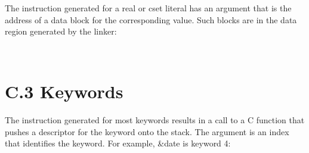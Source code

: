 \begin{flushleft}
\tablelasttail{\hline}
\begin{xtabular}{|m{1.9066598in}|m{2.75596in}|}

\end{xtabular}
\end{flushleft}

The instruction generated for a real or cset literal has an argument
that is the address of a data block for the corresponding value. Such
blocks are in the data region generated by the linker:

\begin{flushleft}
\tablelasttail{\hline}
\begin{xtabular}{|m{1.9066598in}|m{2.75596in}|}

\end{xtabular}
\end{flushleft}

\bigskip

\begin{flushleft}
\tablelasttail{\hline}
\begin{xtabular}{|m{1.9066598in}|m{2.75596in}|}

\end{xtabular}
\end{flushleft}
\section{C.3 Keywords}

The instruction generated for most keywords results in a call to a C
function that pushes a descriptor for the keyword onto the stack. The
argument is an index that identifies the keyword. For example, \&date
is keyword 4:

\begin{flushleft}
\tablelasttail{\hline}
\begin{xtabular}{|m{1.9066598in}|m{2.75596in}|}

\end{xtabular}
\end{flushleft}

